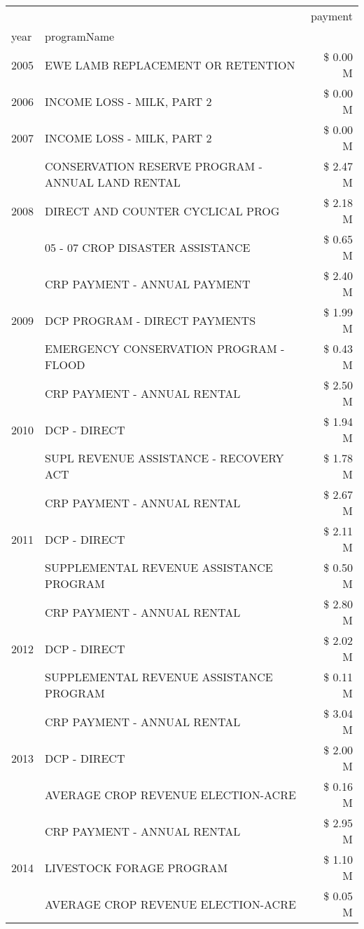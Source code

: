 \begin{tabular}{llr}
\toprule
 &  & payment \\
year & programName &  \\
\midrule
2005 & EWE LAMB REPLACEMENT OR RETENTION & \$ 0.00 M \\
\cline{1-3}
2006 & INCOME LOSS - MILK, PART 2 & \$ 0.00 M \\
\cline{1-3}
2007 & INCOME LOSS - MILK, PART 2 & \$ 0.00 M \\
\cline{1-3}
\multirow[t]{3}{*}{2008} & CONSERVATION RESERVE PROGRAM - ANNUAL LAND RENTAL & \$ 2.47 M \\
 & DIRECT AND COUNTER CYCLICAL PROG & \$ 2.18 M \\
 & 05 - 07 CROP DISASTER ASSISTANCE & \$ 0.65 M \\
\cline{1-3}
\multirow[t]{3}{*}{2009} & CRP PAYMENT - ANNUAL PAYMENT & \$ 2.40 M \\
 & DCP PROGRAM - DIRECT PAYMENTS & \$ 1.99 M \\
 & EMERGENCY CONSERVATION PROGRAM - FLOOD & \$ 0.43 M \\
\cline{1-3}
\multirow[t]{3}{*}{2010} & CRP PAYMENT - ANNUAL RENTAL & \$ 2.50 M \\
 & DCP - DIRECT & \$ 1.94 M \\
 & SUPL REVENUE ASSISTANCE - RECOVERY ACT & \$ 1.78 M \\
\cline{1-3}
\multirow[t]{3}{*}{2011} & CRP PAYMENT - ANNUAL RENTAL & \$ 2.67 M \\
 & DCP - DIRECT & \$ 2.11 M \\
 & SUPPLEMENTAL REVENUE ASSISTANCE PROGRAM & \$ 0.50 M \\
\cline{1-3}
\multirow[t]{3}{*}{2012} & CRP PAYMENT - ANNUAL RENTAL & \$ 2.80 M \\
 & DCP - DIRECT & \$ 2.02 M \\
 & SUPPLEMENTAL REVENUE ASSISTANCE PROGRAM & \$ 0.11 M \\
\cline{1-3}
\multirow[t]{3}{*}{2013} & CRP PAYMENT - ANNUAL RENTAL & \$ 3.04 M \\
 & DCP - DIRECT & \$ 2.00 M \\
 & AVERAGE CROP REVENUE ELECTION-ACRE & \$ 0.16 M \\
\cline{1-3}
\multirow[t]{3}{*}{2014} & CRP PAYMENT - ANNUAL RENTAL & \$ 2.95 M \\
 & LIVESTOCK FORAGE PROGRAM & \$ 1.10 M \\
 & AVERAGE CROP REVENUE ELECTION-ACRE & \$ 0.05 M \\
\cline{1-3}

\end{tabular}
